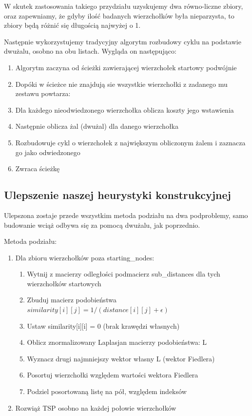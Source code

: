 \documentclass[11pt]{article}
\begin{document}
W skutek zastosowania takiego przydziału uzyskujemy dwa równo-liczne zbiory, oraz zapewniamy, że gdyby ilość badanych wierzchołków była nieparzysta, to zbiory będą różnić się długością najwyżej o 1.

Następnie wykorzystujemy tradycyjny algorytm rozbudowy cyklu na podstawie dwużalu, osobno na obu listach.
Wygląda on następująco:

\begin{enumerate}
    \item Algorytm zaczyna od ścieżki zawierającej wierzchołek startowy podwójnie
    \item Dopóki w ścieżce nie znajdują sie wszystkie wierzchołki z zadanego mu zestawu powtarza:
    \item Dla każdego nieodwiedzonego wierzchołka oblicza koszty jego wstawienia
    \item Następnie oblicza żal (dwużal) dla danego wierzchołka
    \item Rozbudowuje cykl o wierzchołek z największym obliczonym żalem i zaznacza go jako odwiedzonego
    \item Zwraca ścieżkę
\end{enumerate}

\subsection{Ulepszenie naszej heurystyki konstrukcyjnej}\label{subsec:ulepszenie-naszej-heurystyki-konstrukcyjnej}

Ulepszona zostaje przede wszystkim metoda podziału na dwa podproblemy, samo budowanie wciąż odbywa się za pomocą dwużalu, jak poprzednio.

Metoda podziału:
\begin{enumerate}
    \item Dla zbioru wierzchołków poza starting\_nodes:
    \begin{enumerate}
        \item Wytnij z macierzy odległości podmacierz sub\_distances dla tych wierzchołków startowych
        \item Zbuduj macierz podobieństwa $similarity[i][j] = 1 / (distance[i][j] + \epsilon)$
        \item Ustaw similarity[i][i] = 0 (brak krawędzi własnych)
        \item Oblicz znormalizowany Laplasjan macierzy podobieństwa: L
        \item Wyznacz drugi najmniejszy wektor własny L (wektor Fiedlera)
        \item Posortuj wierzchołki względem wartości wektora Fiedlera
        \item Podziel posortowaną listę na pół, względem indeksów
    \end{enumerate}
    \item Rozwiąż TSP osobno na każdej połowie wierzchołków
\end{enumerate}
\end{document}
